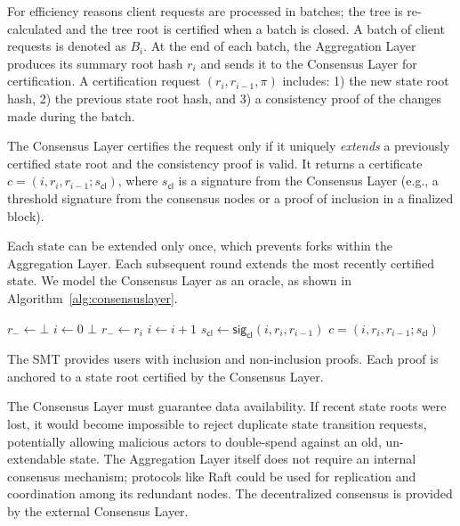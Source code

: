 \documentclass[11pt]{article}
\begin{document}
For efficiency reasons client requests are processed in batches; the tree is re-calculated and the tree root is certified when a batch is closed. A batch of client requests is denoted as $B_i$. At the end of each batch, the Aggregation Layer produces its summary root hash $r_i$ and sends it to the Consensus Layer for certification. A certification request $(r_i, r_{i-1}, \pi)$ includes: 1) the new state root hash, 2) the previous state root hash, and 3) a consistency proof of the changes made during the batch.

The Consensus Layer certifies the request only if it uniquely \textit{extends} a previously certified state root and the consistency proof is valid. It returns a certificate $c = (i, r_i, r_{i-1}; s_{\textsf{cl}})$, where $s_{\textsf{cl}}$ is a signature from the Consensus Layer (e.g., a threshold signature from the consensus nodes or a proof of inclusion in a finalized block).

Each state can be extended only once, which prevents forks within the Aggregation Layer. Each subsequent round extends the most recently certified state.
We model the Consensus Layer as an oracle, as shown in Algorithm~\ref{alg:consensuslayer}.

\begin{algorithm}[tbh]
  \caption{Consensus Layer modeled as an oracle}\label{alg:consensuslayer}
  \begin{algorithmic}[0]
        \State $r_- \gets \bot$
        \State $i \gets 0$
    \EndFunction
            \State \Return $\bot$
        \EndIf
        \State $r_- \gets r_i$
        \State $i \gets i+1$
        \State $s_{\textsf{cl}} \gets \textsf{sig}_\textsf{cl}(i, r_i, r_{i-1})$
        \State \Return $c = (i, r_i, r_{i-1}; s_{\textsf{cl}})$
    \EndFunction
  \end{algorithmic}
\end{algorithm}


The SMT provides users with inclusion and non-inclusion proofs. Each proof is anchored to a state root certified by the Consensus Layer.

The Consensus Layer must guarantee data availability. If recent state roots were lost, it would become impossible to reject duplicate state transition requests, potentially allowing malicious actors to double-spend against an old, un-extendable state. The Aggregation Layer itself does not require an internal consensus mechanism; protocols like Raft could be used for replication and coordination among its redundant nodes. The decentralized consensus is provided by the external Consensus Layer.
\end{document}
